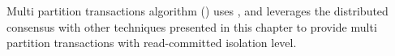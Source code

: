 
Multi partition transactions algorithm (\mpt) uses \paxos, and leverages the distributed consensus with other techniques presented in this chapter to provide multi partition transactions with read-committed isolation level.

